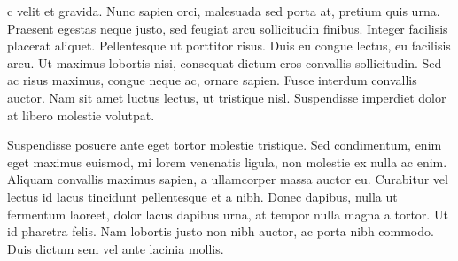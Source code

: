 c velit et gravida. Nunc sapien orci, malesuada sed porta at, pretium quis urna. Praesent egestas neque justo, sed feugiat arcu sollicitudin finibus. Integer facilisis placerat aliquet. Pellentesque ut porttitor risus. Duis eu congue lectus, eu facilisis arcu. Ut maximus lobortis nisi, consequat dictum eros convallis sollicitudin. Sed ac risus maximus, congue neque ac, ornare sapien. Fusce interdum convallis auctor. Nam sit amet luctus lectus, ut tristique nisl. Suspendisse imperdiet dolor at libero molestie volutpat.

Suspendisse posuere ante eget tortor molestie tristique. Sed condimentum, enim eget maximus euismod, mi lorem venenatis ligula, non molestie ex nulla ac enim. Aliquam convallis maximus sapien, a ullamcorper massa auctor eu. Curabitur vel lectus id lacus tincidunt pellentesque et a nibh. Donec dapibus, nulla ut fermentum laoreet, dolor lacus dapibus urna, at tempor nulla magna a tortor. Ut id pharetra felis. Nam lobortis justo non nibh auctor, ac porta nibh commodo. Duis dictum sem vel ante lacinia mollis.